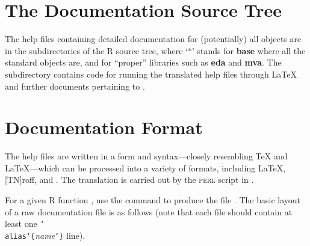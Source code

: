 \newcommand{\pkg}[1]{{\textbf{#1}}}
\newcommand{\var}[1]{{{\normalfont\textit{#1}}}}
\newcommand{\COMMENT}[1]{%
  \hfill\makebox[.5\textwidth][l]{{\normalfont{\% #1}}}}
\newcommand{\EXPLAIN}[1]{\par\relax\qquad\parbox{0.8\textwidth}{#1}\\}
\newcommand{\CMD}[1]{\texttt{{\char`\\}#1}}%
\newcommand{\LB}{\texttt{{\char`\{}}}%
\newcommand{\RB}{\texttt{{\char`\}}}}%
\newcommand{\CMDb}[2]{\texttt{{\char`\\}#1}{\LB{#2}\RB}}%
\newcommand{\CMDv}[2]{\texttt{{\char`\\}#1}{\LB\var{#2}\RB}}%
%
\newcommand{\Ind}{\strut\quad}%
\newcommand{\nlInd}{\\\Ind}%
\newcommand{\nlIInd}{\\\strut\qquad}%

\section{The Documentation Source Tree}

The help files containing detailed documentation for (potentially) all
\R{} objects are in the  subdirectories of
the R source tree, where `$\ast$' stands for \pkg{base} where all the
standard objects are, and for ``proper'' libraries such as \pkg{eda} and
\pkg{mva}.  The  subdirectory contains code for running
the translated help files through \LaTeX{} and further documents
pertaining to \R.

\section{Documentation Format}\label{sec:doc-format}

The help files are written in a form and syntax---closely resembling
\TeX{} and \LaTeX{}---which can be processed into a variety of formats,
including \LaTeX, [TN]roff, and \HTML.  The translation is carried out
by the \textsc{perl} script  in .

For a given R function , use the \R{} command
 to produce the file .  The
basic layout of a raw documentation file is as follows (note that each
file should contain at least one \CMDv{alias}{name} line).

